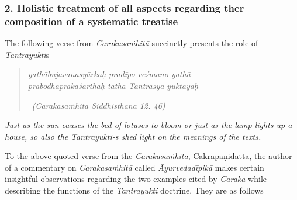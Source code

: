 \subsubsection*{2. Holistic treatment of all aspects regarding ther composition of a systematic treatise}

The following verse from \textit{Carakasaṁhitā} succinctly presents the role of \textit{Tantrayukti}s -

\begin{verse}
\textit{yathābujavanasyārkaḥ pradīpo veśmano yathā}\\\textit{prabodhaprakāśārthāḥ tathā Tantrasya yuktayaḥ }

~\hfill \textit{(Carakasaṁhitā Siddhisthāna 12. 46)}
\end{verse}

\textit{Just as the sun causes the bed of lotuses to bloom or just as the lamp lights up a house, so also the Tantrayukti-s shed light on the meanings of the texts.}

\newpage

To the above quoted verse from the \textit{Carakasaṁhitā}, Cakrapāṇidatta, the author of a commentary on \textit{Carakasaṁhitā} called \textit{Āyurvedadīpikā} makes certain insightful observations regarding the two examples cited by \textit{Caraka} while describing the functions of the \textit{Tantrayukti} doctrine. They are as follows

